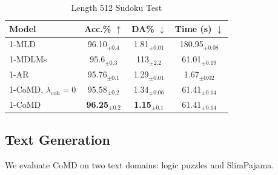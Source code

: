 \documentclass{article} %
\begin{document}
\begin{table}[]
    \centering
    \caption{Length 512 Sudoku Test}
    \label{table:length-512-sudoku-eval}
    
    \begin{tabular}{l c c c} 
        \toprule
        \textbf{Model} & \textbf{Acc.\% $\uparrow$} & \textbf{DA\% $\downarrow$} & \textbf{Time (s) $\downarrow$  }\\ 
        \midrule
        1-MLD \citep{austin2023structured}              & 96.10$_{\pm0.4}$ &  1.81$_{\pm0.01}$ & 180.95$_{\pm0.08}$  \\ 
        1-MDLMs \citep{shih2022training}             & 95.6$_{\pm0.3}$ &  113$_{\pm2.2}$ & 61.01$_{\pm0.19}$  \\ 
        1-AR \citep{austin2023structured}               & 95.76$_{\pm0.1}$ &  1.29$_{\pm0.01}$ & 1.67$_{\pm0.02}$  \\ 
        1-CoMD, $\lambda_\mathrm{coh}=0$   & 95.58$_{\pm0.2}$ &  1.34$_{\pm0.06}$ & 61.41$_{\pm0.14}$ \\ 
        1-CoMD              & \textbf{96.25}$_{\pm0.2}$ &  \textbf{1.15}$_{\pm0.1}$ &  61.41$_{\pm0.14}$ \\ 
        \bottomrule
    \end{tabular}
    
\end{table}


\subsection{Text Generation}
We evaluate CoMD on two text domains: logic puzzles and SlimPajama.
\end{document}
